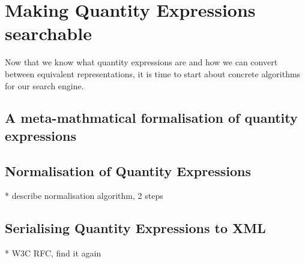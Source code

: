 \section{Making Quantity Expressions searchable}
Now that we know what quantity expressions are and how we can convert between equivalent representations, it is time to start about concrete algorithms for our search engine. 

\subsection{A meta-mathmatical formalisation of quantity expressions}
\label{sec:meq_model}

\subsection{Normalisation of Quantity Expressions}
* describe normalisation algorithm, 2 steps

\subsection{Serialising Quantity Expressions to XML}
* W3C RFC, find it again






